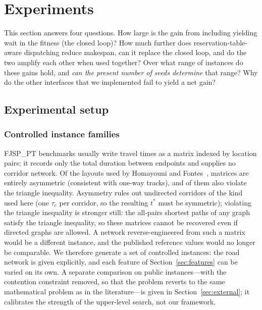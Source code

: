 \section{Experiments}
\label{sec:Chapter_V}

This section answers four questions. How large is the gain from including yielding wait in the fitness (the closed loop)? How much further does reservation-table-aware dispatching reduce makespan, can it replace the closed loop, and do the two amplify each other when used together?
Over what range of instances do these gains hold, and \emph{can the present number of seeds determine} that range? Why do the other interfaces that we implemented fail to yield a net gain?

\subsection{Experimental setup}
\label{sec:instances}

\subsubsection{Controlled instance families}
FJSP\_PT benchmarks usually write travel times as a matrix indexed by location pairs; it records only the total duration between endpoints and supplies no corridor network.
Of the \PubNLayout{} layouts used by Homayouni and Fontes~\cite{homayouni2021production},
\PubNLayoutAsym{} matrices are entirely asymmetric (consistent with one-way tracks), and \PubNLayoutBad{} of them also violate the triangle inequality.
Asymmetry rules out undirected corridors of the kind used here (one $\tau_e$ per corridor, so the resulting $t^{*}$ must be symmetric);
violating the triangle inequality is stronger still: the all-pairs shortest paths of any graph satisfy the triangle inequality, so these \PubNLayoutBad{} matrices cannot be recovered even if directed graphs are allowed.
A network reverse-engineered from such a matrix would be a different instance, and the published reference values would no longer be comparable.
We therefore generate a set of controlled instances: the road network is given explicitly, and each feature of Section~\ref{sec:features} can be varied on its own.
A separate comparison on public instances---with the contention constraint removed, so that the problem reverts to the same mathematical problem as in the literature---is given in Section~\ref{sec:external}; it calibrates the strength of the upper-level search, not our framework.

